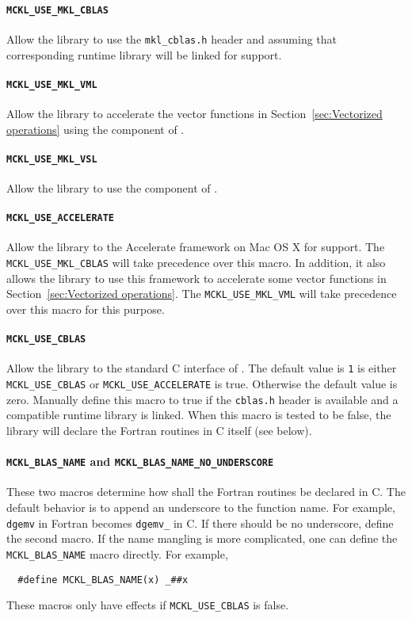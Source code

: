 \paragraph{\texttt{MCKL\_USE\_MKL\_CBLAS}} Allow the library to use the
\verb|mkl_cblas.h| header and assuming that corresponding runtime library will
be linked for \blas support.

\paragraph{\texttt{MCKL\_USE\_MKL\_VML}} Allow the library to accelerate the
vector functions in Section~\ref{sec:Vectorized operations} using the \vml
component of \mkl.

\paragraph{\texttt{MCKL\_USE\_MKL\_VSL}} Allow the library to use the \vsl
component of \mkl.

\paragraph{\texttt{MCKL\_USE\_ACCELERATE}} Allow the library to the Accelerate
framework on Mac OS X for \blas support. The \verb|MCKL_USE_MKL_CBLAS| will
take precedence over this macro. In addition, it also allows the library to use
this framework to accelerate some vector functions in
Section~\ref{sec:Vectorized operations}. The \verb|MCKL_USE_MKL_VML| will take
precedence over this macro for this purpose.

\paragraph{\texttt{MCKL\_USE\_CBLAS}} Allow the library to the standard C
interface of \blas. The default value is \verb|1| is either
\verb|MCKL_USE_CBLAS| or \verb|MCKL_USE_ACCELERATE| is true. Otherwise the
default value is zero. Manually define this macro to true if the \verb|cblas.h|
header is available and a compatible runtime library is linked. When this macro
is tested to be false, the library will declare the \blas Fortran routines in C
itself (see below).

\paragraph{\texttt{MCKL\_BLAS\_NAME} and
  \texttt{MCKL\_BLAS\_NAME\_NO\_UNDERSCORE}} These two macros determine how
shall the \blas Fortran routines be declared in C. The default behavior is to
append an underscore to the function name. For example, \verb|dgemv| in Fortran
becomes \verb|dgemv_| in C. If there should be no underscore, define the second
macro. If the name mangling is more complicated, one can define the
\verb|MCKL_BLAS_NAME| macro directly. For example,
\begin{Verbatim}
  #define MCKL_BLAS_NAME(x) _##x
\end{Verbatim}
These macros only have effects if \verb|MCKL_USE_CBLAS| is false.

